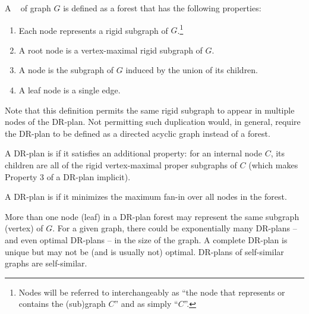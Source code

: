 \begin{definition}
[DR-plan]
\label{def:drp}
    A ~\cite{hoffman2001decompositionI} of graph $G$ is defined as a forest that has the following properties:
    \begin{enumerate}
        \item Each node represents a rigid subgraph of $G$.\footnote{Nodes will be referred to interchangeably as ``the node that represents or contains the (sub)graph $C$'' and as simply ``$C$''.}
        \item A root node is a vertex-maximal rigid subgraph of $G$.
        \item A node is the subgraph of $G$ induced by the union of its children.
        \item A leaf node is a single edge.
    \end{enumerate}
\end{definition}

Note that this definition permits the same rigid subgraph to appear in multiple nodes of the DR-plan. Not permitting such duplication would, in general, require the DR-plan to be defined as a directed acyclic graph instead of a forest.

\begin{definition}
    A DR-plan is  if it satisfies an additional property: for an internal node $C$, its children are all of the rigid vertex-maximal proper subgraphs of $C$ (which makes Property 3 of a DR-plan implicit).
\end{definition}

\begin{definition}
    A DR-plan is  if it minimizes the maximum fan-in over all nodes in the forest.
\end{definition}






%
\begin{remark}
  More than one node (leaf) in a DR-plan forest may represent the same subgraph (vertex) of $G$.
  For a given graph, there could be exponentially many DR-plans -- and even optimal DR-plans -- in the size of the graph. A complete DR-plan is unique but may not be (and is usually not) optimal. DR-plans of self-similar graphs are self-similar.
\end{remark}

